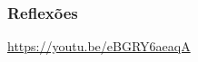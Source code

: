 \documentclass[aspectratio=169]{beamer}
\begin{document}

\begin{frame}\frametitle{Reflexões}
\url{https://youtu.be/eBGRY6aeaqA}
\end{frame}
\end{document}

